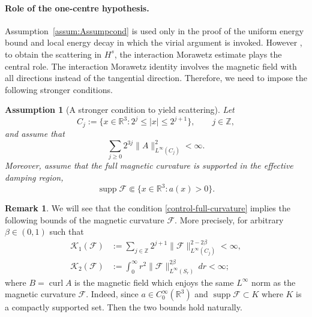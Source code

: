 \documentclass[10pt%
]{amsart}
\numberwithin{equation}{section}
\newcommand{\R}{\mathbb{R}}
\newcommand{\Z}{\mathbb{Z}}
\newtheorem{assumption}{Assumption}[section]
\theoremstyle{definition}
\newtheorem{remark}[theorem]{Remark}
\def\supp{\mathop{\mathrm{supp}}\nolimits}
\def\curl{\mathop{\mathrm{curl}}\nolimits}
\newcommand{\Fcurv}{\mathcal{F}}
\begin{document}
	\paragraph{Role of the one-centre hypothesis.}
	Assumption~\ref{assum:Assumpcond} is used only in the proof of the uniform energy bound and local energy decay in which the virial argument is invoked. However , to obtain the scattering in $H^s$, the interaction Morawetz estimate plays the central role. The interaction Morawetz identity  involves the magnetic field with all directions instead of the tangential direction.
	Therefore, we need to impose the following stronger conditions.
	\begin{assumption}[A stronger condition to yield scattering]\label{assum:scattering}
		Let
		\[
		C_j:=\{x\in\R^3:2^j\le |x|\le2^{j+1}\},\qquad j\in\Z,
		\]
		and assume that 
		\begin{equation}\label{condition1}
			\sum_{j\ge0}2^{3j}\|A\|_{L^\infty(C_j)}^2<\infty.
		\end{equation}
		Moreover, assume that the full magnetic curvature is supported in the effective damping region,
			\begin{equation}\label{control-full-curvature}
				\operatorname{supp}\Fcurv\Subset\{x\in\R^3:a(x)>0\}.
			\end{equation}
	

	\end{assumption}
\begin{remark}\label{magnetic-condition}
We will see that the condition \eqref{control-full-curvature} implies the following bounds of the magnetic curvature $\Fcurv$. More precisely, 
    	for arbitrary $\beta\in(0,1)$ such that
			\begin{align}
				\mathcal K_1(\Fcurv)&:=\sum_{j\in\Z}2^{j+1}\|\Fcurv\|_{L^\infty(C_j)}^{2-2\beta}<\infty,\label{condition:K1}\\
				\mathcal K_2(\Fcurv)&:=\int_0^\infty r^2\|\Fcurv\|_{L^\infty(S_r)}^{2\beta}\,dr<\infty;\label{condition:K2}
			\end{align}
where $B=\curl A$ is the  magnetic field which enjoys the same $L^\infty$ norm as the magnetic curvature $\Fcurv$. Indeed, since $a\in C_0^\infty(\R^3)$ and $\supp \Fcurv\subset K$ where $K$ is a compactly supported set. Then the two bounds hold naturally.  
\end{remark}
\end{document}
